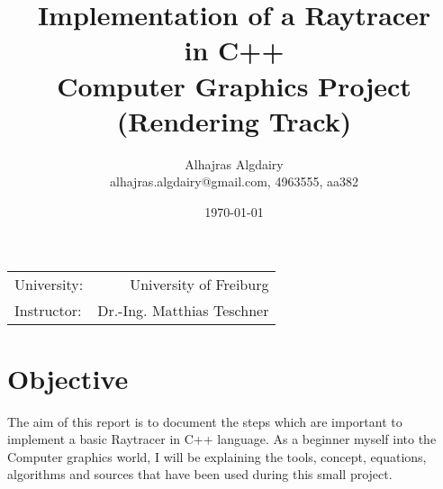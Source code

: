 \documentclass{article}
\title{Implementation of a Raytracer \\ in C++ \\ Computer Graphics Project (Rendering Track)} %
\author{Alhajras Algdairy \\alhajras.algdairy@gmail.com, 4963555, aa382} %
\date{\today} %
\begin{document}
\maketitle %

\begin{center}
\begin{tabular}{l r}
University: & University of Freiburg \\ %
Instructor: &Dr.-Ing. Matthias Teschner %
\end{tabular}
\end{center}
\clearpage

\tableofcontents
\clearpage
\section{Objective}

The aim of this report is to document the steps which are important to implement a basic Raytracer in C++ language.  As a beginner myself into the Computer graphics world, I will be explaining the tools, concept, equations, algorithms and sources that have been used during this small project.  


\end{document}
